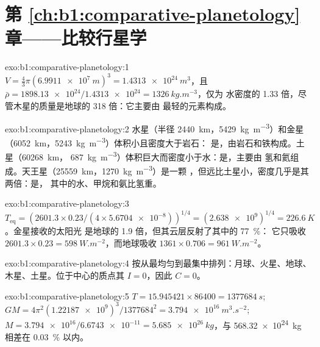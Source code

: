 \section*{第 \ref{ch:b1:comparative-planetology} 章——比较行星学}

\begin{solution}{exo:b1:comparative-planetology:1}
$V = \tfrac43\pi(\qty{6.9911e7}{m})^3 = \qty{1.4313e24}{m^3}$，且
$\bar\rho = \num{1898.13e24}/\num{1.4313e24} = \qty{1326}{kg.m^{-3}}$，仅为
水密度的 1.33 倍，尽管木星的质量是地球的 318 倍：它主要由
最轻的元素构成。
\end{solution}

\begin{solution}{exo:b1:comparative-planetology:2}
水星（半径 \qty{2440}{km}，\qty{5429}{kg.m^{-3}}）和金星
（\qty{6052}{km}，\qty{5243}{kg.m^{-3}}）体积小且密度大于岩石：
是，由岩石和铁构成。土星（\qty{60268}{km}，
\qty{687}{kg.m^{-3}}）体积巨大而密度小于水：是，主要由
氢和氦组成。天王星（\qty{25559}{km}，\qty{1270}{kg.m^{-3}}）是一颗
，但远比土星小，密度几乎是其两倍：是，
其中的水、甲烷和氨比氢重。
\end{solution}

\begin{solution}{exo:b1:comparative-planetology:3}
$T_\mathrm{eq} = (2601.3\times0.23/(4\times\num{5.6704e-8}))^{1/4} =
(\num{2.638e9})^{1/4} = \qty{226.6}{K}$。金星接收的太阳光
是地球的 1.9 倍，但其云层反射了其中的 \qty{77}{\percent}：
它只吸收 $2601.3\times0.23 = \qty{598}{W.m^{-2}}$，而地球吸收
$1361\times0.706 = \qty{961}{W.m^{-2}}$。
\end{solution}

\begin{solution}{exo:b1:comparative-planetology:4}
按从最均匀到最集中排列：月球、火星、地球、
木星、土星。位于中心的质点其 $I = 0$，因此 $C = 0$。
\end{solution}

\begin{solution}{exo:b1:comparative-planetology:5}
$T = 15.945421\times86400 = \qty{1377684}{s}$;
$GM = 4\pi^2(\num{1.22187e9})^3/\num{1377684}^2 = \qty{3.794e16}{m^3.s^{-2}}$;
$M = \num{3.794e16}/\num{6.6743e-11} = \qty{5.685e26}{kg}$，与
\qty{568.32e24}{kg} 相差在 \qty{0.03}{\percent} 以内。
\end{solution}

